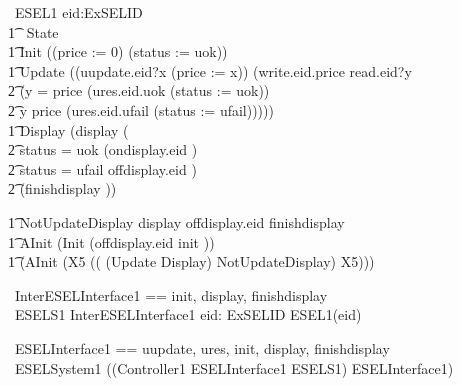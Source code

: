 \begin{circus}
	\circprocess\ ESEL1 \circdef eid:ExSELID \circspot \circbegin \\
    	\t1 \circstate\ State  \\

    	\t1	Init \circdef ((price := 0) \circseq (status := uok)) \\

        \t1 Update \circdef ((uupdate.eid?x \then (price := x)) \circseq (write.eid.price \then read.eid?y \\
            \t2 \then (\lcircguard y = price \rcircguard \circguard (ures.eid.uok \then (status := uok)) \\
            \t2  \extchoice \lcircguard y \neq price \rcircguard \circguard (ures.eid.ufail \then (status := ufail))))) \\

        \t1 Display \circdef (display \then (\\
            \t2  \lcircguard status = uok \rcircguard \circguard (ondisplay.eid \then \Skip) \\
            \t2 \extchoice \lcircguard status = ufail \rcircguard \circguard offdisplay.eid \then \Skip) \\
            \t2 \circseq (finishdisplay \then \Skip))

        \t1 NotUpdateDisplay \circdef display \then offdisplay.eid \then finishdisplay \then \Skip \\

        \t1 AInit \circdef  (Init \circseq (offdisplay.eid \then init \then \Skip))\\

	    \t1 \circspot (AInit \circseq (\circmu X5 \circspot (( (Update \circseq Display) \extchoice NotUpdateDisplay) \circseq X5))) \\
	\circend
\end{circus}

\begin{circus}
    \circchannelset\ InterESELInterface1 == \lchanset init, display, finishdisplay \rchanset \\
    \circprocess\ ESELS1 \circdef  \lpar InterESELInterface1 \rpar eid: ExSELID  \circspot ESEL1(eid)
\end{circus}

\begin{circus}
    \circchannelset\ ESELInterface1 == \lchanset uupdate, ures, init, display, finishdisplay \rchanset \\
    \circprocess\ ESELSystem1 \circdef ((Controller1 \lpar ESELInterface1 \rpar ESELS1) \circhide ESELInterface1)
\end{circus}


